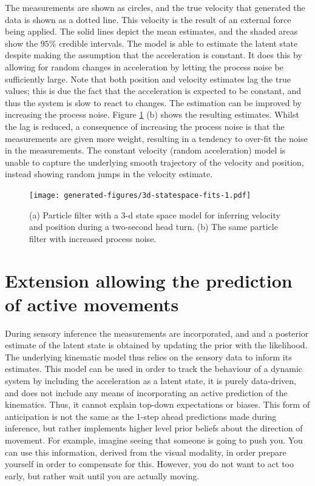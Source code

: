 \documentclass[english,floatsintext,man]{apa6}
\theoremstyle{definition}
\theoremstyle{definition}
\theoremstyle{remark}
\begin{document}
The measurements are shown as circles, and the true velocity that
generated the data is shown as a dotted line. This velocity is the
result of an external force being applied. The solid lines depict the
mean estimates, and the shaded areas show the \(95\%\) credible
intervals. The model is able to estimate the latent state despite making
the assumption that the acceleration is constant. It does this by
allowing for random changes in acceleration by letting the process noise
be sufficiently large. Note that both position and velocity estimates
lag the true values; this is due the fact that the acceleration is
expected to be constant, and thus the system is slow to react to
changes. The estimation can be improved by increasing the process noise.
Figure \ref{fig:3d-statespace-fits} (b) shows the resulting estimates.
Whilst the lag is reduced, a consequence of increasing the process noise
is that the measurements are given more weight, resulting in a tendency
to over-fit the noise in the measurements. The constant velocity (random
acceleration) model is unable to capture the underlying smooth
trajectory of the velocity and position, instead showing random jumps in
the velocity estimate.

\begin{figure}
\centering
\texttt{[image: generated-figures/3d-statespace-fits-1.pdf]}
\caption{\label{fig:3d-statespace-fits}(a) Particle filter with a 3-d state
space model for inferring velocity and position during a two-second head
turn. (b) The same particle filter with increased process noise.}
\end{figure}

\section{Extension allowing the prediction of active
movements}\label{extension-allowing-the-prediction-of-active-movements}

During sensory inference the measurements are incorporated, and and a
posterior estimate of the latent state is obtained by updating the prior
with the likelihood. The underlying kinematic model thus relies on the
sensory data to inform its estimates. This model can be used in order to
track the behaviour of a dynamic system by including the acceleration as
a latent state, it is purely data-driven, and does not include any means
of incorporating an active prediction of the kinematics. Thus, it cannot
explain top-down expectations or biases. This form of anticipation is
not the same as the 1-step ahead predictions made during inference, but
rather implements higher level prior beliefs about the direction of
movement. For example, imagine seeing that someone is going to push you.
You can use this information, derived from the visual modality, in order
prepare yourself in order to compensate for this. However, you do not
want to act too early, but rather wait until you are actually moving.
\end{document}
